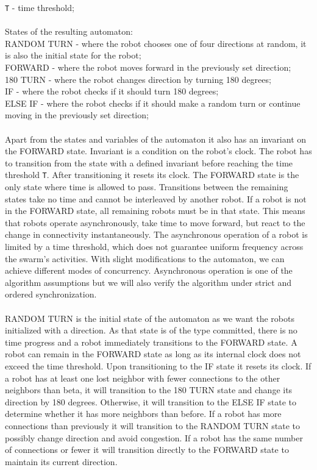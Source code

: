 \texttt{T} - time threshold;
\\\\
States of the resulting automaton:\\
RANDOM TURN - where the robot chooses one of four directions at random, it is also the initial state for the robot;\\
FORWARD - where the robot moves forward in the previously set direction;\\
180 TURN - where the robot changes direction by turning 180 degrees;\\
IF - where the robot checks if it should turn 180 degrees; \\
ELSE IF - where the robot checks if it should make a random turn or continue moving in the previously set direction;
\\\\
Apart from the states and variables of the automaton it also has an invariant on the FORWARD state. Invariant is a condition on the robot's clock. The robot has to transition from the state with a defined invariant before reaching the time threshold \texttt{T}. After transitioning it resets its clock. The FORWARD state is the only state where time is allowed to pass. Transitions between the remaining states take no time and cannot be interleaved by another robot. If a robot is not in the FORWARD state, all remaining robots must be in that state. This means that robots operate asynchronously, take time to move forward, but react to the change in connectivity instantaneously. The asynchronous operation of a robot is limited by a time threshold, which does not guarantee uniform frequency across the swarm's activities. With slight modifications to the automaton, we can achieve different modes of concurrency. Asynchronous operation is one of the algorithm assumptions but we will also verify the algorithm under strict and ordered synchronization.
\\\\
RANDOM TURN is the initial state of the automaton as we want the robots initialized with a direction. As that state is of the type committed, there is no time progress and a robot immediately transitions to the FORWARD state. A robot can remain in the FORWARD state as long as its internal clock does not exceed the time threshold. Upon transitioning to the IF state it resets its clock. If a robot has at least one lost neighbor with fewer connections to the other neighbors than beta, it will transition to the 180 TURN state and change its direction by 180 degrees. Otherwise, it will transition to the ELSE IF state to determine whether it has more neighbors than before. If a robot has more connections than previously it will transition to the RANDOM TURN state to possibly change direction and avoid congestion. If a robot has the same number of connections or fewer it will transition directly to the FORWARD state to maintain its current direction.
